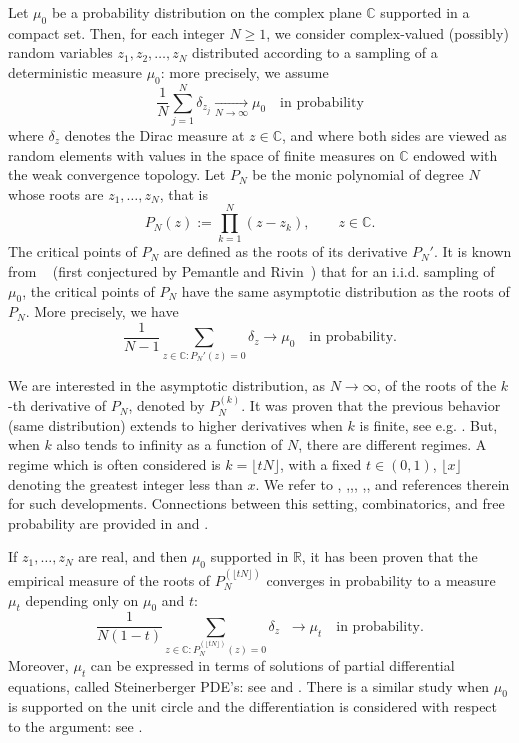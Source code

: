 \documentclass[11pt]{amsart}
\def\CC{{\mathbb{C}}}
\begin{document}
Let  $\mu_0$ be a  probability distribution on the complex plane $\mathbb C$ supported in a compact set. Then, for each integer $N \geq 1$, we consider  complex-valued (possibly) random variables $z_1,z_2,\ldots, z_N$ distributed  according to a sampling of a deterministic measure $\mu_0$: more precisely, we assume
$$ \frac{1}{N} \sum_{j=1}^N \delta_{z_j} \underset{N \rightarrow \infty}{\longrightarrow} \mu_0 \quad \text{in probability}$$
 where $\delta_z$ denotes the Dirac measure at $z\in \mathbb C$, and where both sides are viewed as random elements with values in the space of finite measures on $\mathbb C$ endowed with the weak convergence topology. 
Let $P_N$ be the monic polynomial of degree $N$ whose roots are $z_1,\ldots,z_N$, that is
$$
P_N(z) := \prod_{k=1}^N (z-z_k), \qquad z\in \mathbb C.
$$
The critical points of $P_N$ are defined as the roots of its derivative $P_N'$. It is known from ~\cite{Kabluchko2015} (first conjectured by Pemantle and Rivin~\cite{pemantle_rivin}) that for an i.i.d. sampling of $\mu_0$, the critical points of $P_N$ have the same asymptotic distribution as the roots of $P_N$.  More precisely, we have
$$
\frac{1}{N-1} \sum_{z\in \mathbb C: P_N'(z) =0} \delta_z \rightarrow \mu_0\quad \text{in probability}.
$$

We are interested in the asymptotic distribution, as $N\to\infty$, of the roots of the 
$k$-th derivative of $P_N$, denoted by $P_N^{(k)}$. It was proven that the previous behavior (same distribution) extends to higher derivatives when $k$ is finite, see e.g. \cite{byun-lee-reddy}. But, when $k$ also tends to infinity as a function of $N$, there are different regimes. A  regime which is often considered is
$k= \lfloor t N\rfloor$, with a fixed  $t \in (0,1)$, $ \lfloor x \rfloor$ denoting the greatest  integer less than  $x$. We refer to \cite{galligo2024anti}, \cite{galligo2025dynamics},\cite{michelen2024almost},\cite{michelen2024zeros}, \cite{Feng_Yao2019zeros},\cite{hoskins2021dynamics}, \cite{jalowy2025zeros} and references therein for such developments. Connections between this setting, combinatorics, and free probability are provided in \cite{arizmendi-fujie-ueda} and \cite{arizmendi2024finitefreecumulantsmultiplicative}. 

If $z_1, \dots, z_N$ are real, and then $\mu_0$ supported in $\mathbb{R}$, it has been proven that the empirical measure of the roots of 
$P_N^{(\lfloor tN \rfloor)}$ converges in probability to a measure $\mu_t$ depending only on $\mu_0$ and $t$:
$$
\frac{1}{N (1-t)} \sum_{z\in \CC : P_N^{(\lfloor t N\rfloor)}(z)=0} \delta_z \;\; \rightarrow \mu_t
\quad \text{in probability}.
$$
Moreover, $\mu_t$ can be expressed in terms of solutions of partial differential equations, called Steinerberger PDE's: see \cite{alazard-lazar-nguyen} and \cite{kiselev-tan}.   There is a similar study when $\mu_0$ is supported on the unit circle and the differentiation is considered with respect to the argument: see \cite{kabluchko2021repeated}.  
\end{document}
